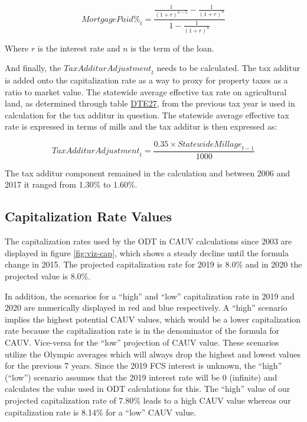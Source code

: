 \documentclass[]{article}
\begin{document}
\[ {Mortgage Paid \%}_t = \frac{ \frac{1}{ (1 + r)^{n-5} } - \frac{1}{ (1 + r)^n} }{ 1 - \frac{1}{(1 + r)^n} } \]

Where \(r\) is the interest rate and \(n\) is the term of the loan.

And finally, the \({Tax Additur Adjustment}_t\) needs to be calculated.
The tax additur is added onto the capitalization rate as a way to proxy
for property taxes as a ratio to market value. The statewide average
effective tax rate on agricultural land, as determined through table
\href{https://www.tax.ohio.gov/tax_analysis/tax_data_series/publications_tds_property.aspx\#Allpropertytaxes}{DTE27},
from the previous tax year is used in calculation for the tax additur in
question. The statewide average effective tax rate is expressed in terms
of mills and the tax additur is then expressed as:

\[ {Tax Additur Adjustment}_t = \frac{0.35 \times {Statewide Millage}_{t-1} }{1000} \]

The tax additur component remained in the calculation and between 2006
and 2017 it ranged from 1.30\% to 1.60\%.

\hypertarget{capitalization-rate-values}{%
\subsection{Capitalization Rate
Values}\label{capitalization-rate-values}}

The capitalization rates used by the ODT in CAUV calculations since 2003
are displayed in figure \ref{fig:viz-cap}, which shows a steady decline
until the formula change in 2015. The projected capitalization rate for
2019 is 8.0\% and in 2020 the projected value is 8.0\%.

In addition, the scenarios for a ``high'' and ``low'' capitalization
rate in 2019 and 2020 are numerically displayed in red and blue
respectively. A ``high'' scenario implies the highest potential CAUV
values, which would be a lower capitalization rate because the
capitalization rate is in the denominator of the formula for CAUV.
Vice-versa for the ``low'' projection of CAUV value. These scenarios
utilize the Olympic averages which will always drop the highest and
lowest values for the previous 7 years. Since the 2019 FCS interest is
unknown, the ``high'' (``low'') scenario assumes that the 2019 interest
rate will be 0 (infinite) and calculates the value used in ODT
calculations for this. The ``high'' value of our projected
capitalization rate of 7.80\% leads to a high CAUV value whereas our
capitalization rate is 8.14\% for a ``low'' CAUV value.
\end{document}
